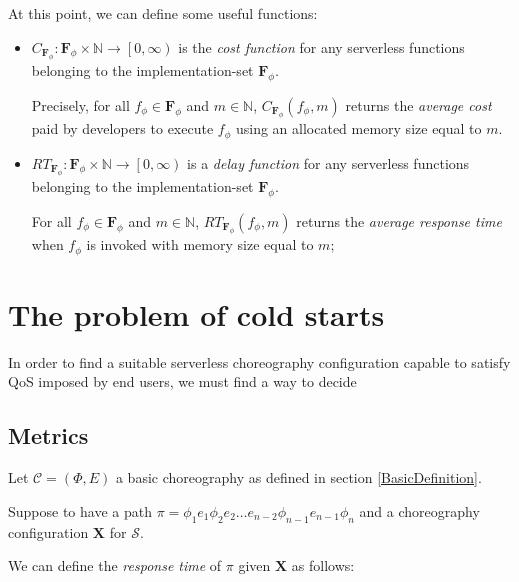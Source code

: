 \documentclass[12pt,a4paper]{report}
\newcommand*{\N}{\mathbb{N}}
\theoremstyle{definition}
\begin{document}
At this point, we can define some useful functions:

\begin{itemize}	
	\item $C_{\textbf{F}_{\phi}} : \textbf{F}_{\phi} \times \N \to \left[ 0, \infty \right)$ is the \textit{cost function} for any serverless functions belonging to the implementation-set $\textbf{F}_{\phi}$.
	
	Precisely, for all $f_{\phi} \in \textbf{F}_{\phi}$ and $m \in \N$, $C_{\textbf{F}_{\phi}}(f_{\phi}, m)$ returns the \textit{average cost} paid by developers to execute $f_{\phi}$ using an allocated memory size equal to $m$.
	
	
	\item $RT_{\textbf{F}_{\phi}} : \textbf{F}_{\phi} \times \N \to \left[ 0, \infty \right)$ is a \textit{delay function} for any serverless functions belonging to the implementation-set $\textbf{F}_{\phi}$.
	
	For all $f_{\phi} \in \textbf{F}_{\phi}$ and $m \in \N$, $RT_{\textbf{F}_{\phi}}(f_{\phi}, m)$ returns the \textit{average response time} when $f_{\phi}$ is invoked with memory size equal to $m$;
\end{itemize}






\section{The problem of cold starts}

In order to find a suitable serverless choreography configuration capable to satisfy QoS imposed by end users, we must find a way to decide  





\subsection{Metrics}

Let $\mathcal{C} = (\Phi,E)$ a basic choreography as defined in section \ref{BasicDefinition}.



Suppose to have a path $\pi = \phi_1 e_1 \phi_2 e_2 \ldots e_{n-2}\phi_{n-1} e_{n-1} \phi_n$ and a choreography configuration $\textbf{X}$ for $\mathcal{S}$. 

We can define the \textit{response time} of $\pi$ given $\textbf{X}$ as follows:
\end{document}
